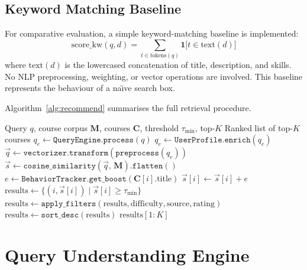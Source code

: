 \documentclass[12pt, a4paper]{article}
\begin{document}
\subsection{Keyword Matching Baseline}

For comparative evaluation, a simple keyword-matching baseline is implemented:
\begin{equation}
    \text{score\_kw}(q, d) = \sum_{t \in \text{tokens}(q)} \mathbf{1}\bigl[t \in \text{text}(d)\bigr]
    \label{eq:keyword}
\end{equation}
where $\text{text}(d)$ is the lowercased concatenation of title, description, and skills. No NLP
preprocessing, weighting, or vector operations are involved. This baseline represents the behaviour
of a na\"{\i}ve search box.

Algorithm~\ref{alg:recommend} summarises the full retrieval procedure.

\begin{algorithm}[htbp]
\caption{NLPRec Retrieval and Ranking}
\label{alg:recommend}
\begin{algorithmic}[1]
\Require Query $q$, course corpus $\mathbf{M}$, courses $\mathbf{C}$, threshold $\tau_{\min}$, top-$K$
\Ensure Ranked list of top-$K$ courses
\State $q_e \gets \texttt{QueryEngine.process}(q)$  
\State $q_e \gets \texttt{UserProfile.enrich}(q_e)$ 
\State $\vec{q} \gets \texttt{vectorizer.transform}(\texttt{preprocess}(q_e))$
\State $\vec{s} \gets \texttt{cosine\_similarity}(\vec{q},\, \mathbf{M}).\texttt{flatten}()$
    \State $e \gets \texttt{BehaviorTracker.get\_boost}(\mathbf{C}[i].\text{title})$
    \State $\vec{s}[i] \gets \vec{s}[i] + e$
\EndFor
\State $\text{results} \gets \{(i, \vec{s}[i]) \mid \vec{s}[i] \geq \tau_{\min}\}$
\State $\text{results} \gets \texttt{apply\_filters}(\text{results}, \text{difficulty}, \text{source}, \text{rating})$
\State $\text{results} \gets \texttt{sort\_desc}(\text{results})$
\Return $\text{results}[1:K]$
\end{algorithmic}
\end{algorithm}

\section{Query Understanding Engine}
\label{sec:query_engine}
\end{document}
